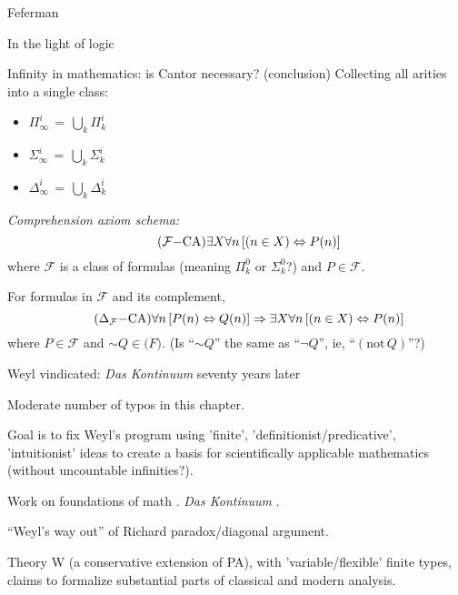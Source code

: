 \begin{plSection}{Feferman}
\begin{plSection}{In the light of logic}
\begin{plSection}{Infinity in mathematics: is Cantor necessary? (conclusion)}
Collecting all arities into a single class:
\begin{itemize}
  \item $\Pi^i_{\infty} \, = \, \bigcup_k \Pi^i_k$
  \item $\Sigma^i_{\infty} \, = \, \bigcup_k \Sigma^i_k$
  \item $\Delta^i_{\infty} \, = \, \bigcup_k \Delta^i_k$
\end{itemize}

\textit{Comprehension axiom schema:}
\begin{equation}
\tag{$\mathcal{F}{-}\text{CA}$}
\exists X \forall n \left[ (n \in X) \Leftrightarrow P(n) \right]
\end{equation}
where $\mathcal{F}$ is a class of formulas 
\textmd{(meaning $\Pi^0_k$ or $\Sigma^0_k$?)}
and $P \in \mathcal{F}$.

For formulas in $\mathcal{F}$ and its complement,
\begin{equation}
\tag{$\Delta_{\mathcal{F}}{-}\text{CA}$}
\forall n \left[ P(n) \Leftrightarrow Q(n) \right]
\Rightarrow 
\exists X \forall n \left[ (n \in X) \Leftrightarrow P(n) \right]
\end{equation}
where $P \in \mathcal{F}$ and $\sim Q \in \mathcal(F)$.
\textmd{
(Is ``$\sim Q$'' the same as ``$\lnot Q$'', ie, 
``$(\text{not}\, Q)$''?)}

\end{plSection}%
\begin{plSection}{Weyl vindicated: \textit{Das Kontinuum} seventy years later}
\label{sec:Weyl_vindicated}

Moderate number of typos in this 
chapter. 

Goal is to fix Weyl's program 
using 'finite', 'definitionist/predicative', 'intuitionist' ideas
to create a basis for scientifically applicable mathematics
(without uncountable infinities?).

Work on foundations of math .
\textit{Das Kontinuum} .

``Weyl's way out'' of Richard paradox/diagonal 
argument.~\cite[p 262]{Feferman:1998:LightOfLogic} 

Theory W (a conservative extension of PA),
with 'variable/flexible' finite types,
claims to formalize substantial parts of
classical and modern 
analysis.~\cite[ch~13 sec~8]{Feferman:1998:LightOfLogic}


\end{plSection}
\end{plSection}
\end{plSection}
